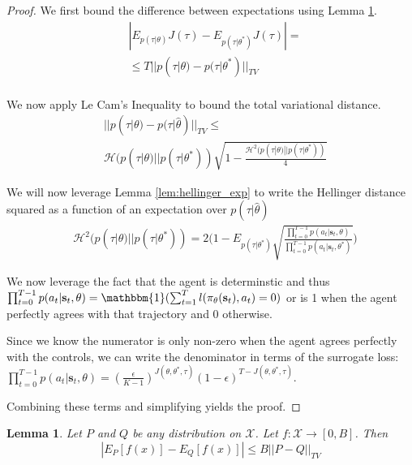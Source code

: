 \documentclass[conference]{article}
\newcommand{\bs}{\mathbf{s}}
\newtheorem{lemma}[theorem]{Lemma}
\newtheorem{proof}[theorem]{proof}
\begin{document}
\begin{proof}
We first bound the difference between expectations using Lemma \ref{lem:tv_dist}. 
\begin{align}
&|E_{p(\tau|\theta)} J(\tau) - E_{p(\tau|\theta^*)} J(\tau)| =\\
&\leq T||p(\tau|\theta) - p(\tau|\theta^*)||_{TV}\\ 
 \end{align}
 
 We now apply Le Cam's Inequality to bound the total variational distance. 
 \begin{align}
&||p(\tau|\theta) - p(\tau|\hat{\theta})||_{TV} \leq \nonumber \\
&\mathcal{H}(p(\tau|\theta) || p(\tau|\theta^*))\sqrt{1-\frac{\mathcal{H}^2(p(\tau|\theta) || p(\tau|\theta^*))}{4}}\nonumber
\end{align}

We will now leverage Lemma \ref{lem:hellinger_exp} to write the Hellinger distance squared as a function of an expectation over $p(\tau|\hat{\theta})$
\begin{align}
&\mathcal{H}^2(p(\tau|\theta)||p(\tau|\theta^*)) = 2\big(1-E_{p(\tau|\theta^*)} \sqrt{\frac{\prod^{T-1}_{t=0} p(a_t|\bs_t,\theta)}{\prod^{T-1}_{t=0} p(a_t|\bs_t,\theta^*)}}\big) \nonumber 
\end{align}

We now leverage the fact that the agent is determinstic and thus 
$\prod^{T-1}_{t=0} p(a_t|\bs_t,\theta) = \mathbbm{1}(\sum^T_{t=1} l(\pi_{\theta}(\bs_{t}),a_t)=0)$ or is 1 when the agent perfectly agrees with that trajectory and 0 otherwise. 

Since we know the numerator is only non-zero when the agent agrees perfectly with the controls, we can write the denominator in terms of the surrogate loss: $\prod^{T-1}_{t=0} p(a_t|\bs_t,\theta) = (\frac{\epsilon}{K-1})^{J(\theta,\theta^*,\tau)}(1-\epsilon)^{T-J(\theta,\theta^*,\tau)}$. 

Combining these terms and simplifying yields the proof. 
\end{proof}


\begin{lemma}\label{lem:tv_dist}
Let $P$ and $Q$ be any distribution on $\mathcal{X}$. Let $f:\mathcal{X} \rightarrow [0,B]$. Then
$$|E_{P}[f(x)] - E_Q[f(x)]| \leq B ||P-Q||_{TV}$$
\end{lemma}
\end{document}
